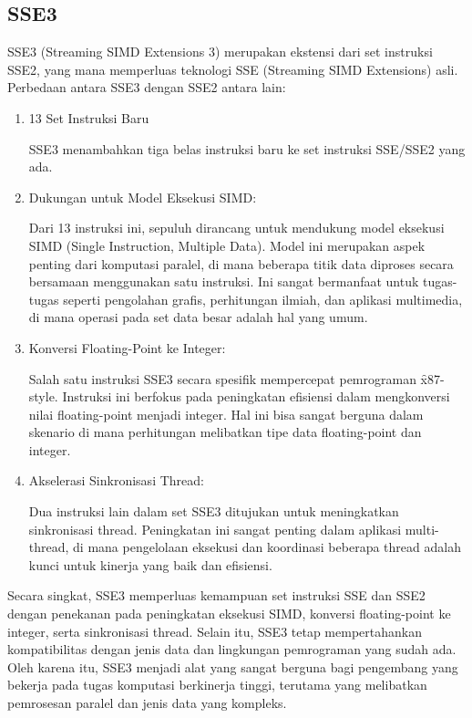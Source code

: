 \subsection{SSE3}
SSE3 (Streaming SIMD Extensions 3) merupakan ekstensi dari set instruksi SSE2, yang mana memperluas teknologi SSE (Streaming SIMD Extensions) asli. Perbedaan antara SSE3 dengan SSE2 antara lain:

\begin{enumerate}
	\item 13 Set Instruksi Baru

	      SSE3 menambahkan tiga belas instruksi baru ke set instruksi SSE/SSE2 yang ada\cite{Hassaballah2008}.

	\item Dukungan untuk Model Eksekusi SIMD:

	      Dari 13 instruksi ini, sepuluh dirancang untuk mendukung model eksekusi SIMD (Single Instruction, Multiple Data). Model ini merupakan aspek penting dari komputasi paralel, di mana beberapa titik data diproses secara bersamaan menggunakan satu instruksi. Ini sangat bermanfaat untuk tugas-tugas seperti pengolahan grafis, perhitungan ilmiah, dan aplikasi multimedia, di mana operasi pada set data besar adalah hal yang umum\cite{Hassaballah2008}.

	\item Konversi Floating-Point ke Integer:

	      Salah satu instruksi SSE3 secara spesifik mempercepat pemrograman \f{x87-style}. Instruksi ini berfokus pada peningkatan efisiensi dalam mengkonversi nilai floating-point menjadi integer. Hal ini bisa sangat berguna dalam skenario di mana perhitungan melibatkan tipe data floating-point dan integer\cite{Hassaballah2008}.

	\item Akselerasi Sinkronisasi Thread:

	      Dua instruksi lain dalam set SSE3 ditujukan untuk meningkatkan sinkronisasi thread. Peningkatan ini sangat penting dalam aplikasi multi-thread, di mana pengelolaan eksekusi dan koordinasi beberapa thread adalah kunci untuk kinerja yang baik dan efisiensi\cite{Hassaballah2008}.
\end{enumerate}

Secara singkat, SSE3 memperluas kemampuan set instruksi SSE dan SSE2 dengan penekanan pada peningkatan eksekusi SIMD, konversi floating-point ke integer, serta sinkronisasi thread. Selain itu, SSE3 tetap mempertahankan kompatibilitas dengan jenis data dan lingkungan pemrograman yang sudah ada. Oleh karena itu, SSE3 menjadi alat yang sangat berguna bagi pengembang yang bekerja pada tugas komputasi berkinerja tinggi, terutama yang melibatkan pemrosesan paralel dan jenis data yang kompleks.


